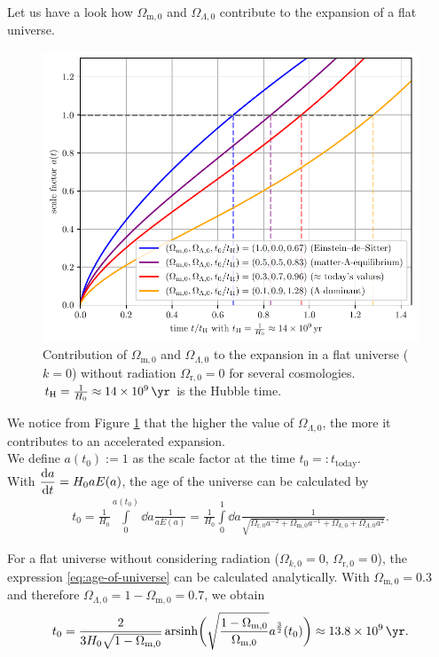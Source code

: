 \noindent Let us have a look how $\Omega_{\text{m},0}$ and $\Omega_{\Lambda,0}$ contribute to the expansion of a flat universe. 

\begin{figure}[H]
    \centering
    \includegraphics[scale=1.0]{figures/plots/PDF/time-vs-scale-factor}
    \caption{Contribution of $\Omega_{\text{m},0}$ and $\Omega_{\Lambda,0}$ to the expansion in a flat universe ($k = 0$) without radiation $\Omega_{\text{r},0} = 0$ for several cosmologies. $t_{\text{H}} = \frac{1}{H_{0}} \approx \SI{14e+9}{\yr}$ is the Hubble time.}
    \label{fig:time-vs-scale-factor}
\end{figure}

\noindent We notice from Figure \ref{fig:time-vs-scale-factor} that the higher the value of $\Omega_{\Lambda,0}$, the more it contributes to an accelerated expansion. \\

\noindent We define $a(t_{0}) := 1$ as the scale factor at the time $t_{0} =: t_{\text{today}}$. \\
With $\displaystyle \dv{a}{t} = H_{0} a E(a)$, the age of the universe can be calculated by 
\begin{align}
    t_{0} = \frac{1}{H_{0}} \int\limits_{0}^{a(t_{0})} \dd{a} \frac{1}{a E(a)} = \frac{1}{H_{0}} \int\limits_{0}^{1} \dd{a} \frac{1}{\sqrt{\Omega_{\text{r},0} a^{-2} + \Omega_{\text{m},0} a^{-1} + \Omega_{k,0} + \Omega_{\Lambda,0} a^{2}}}. \label{eq:age-of-universe}
\end{align}

\noindent For a flat universe without considering radiation ($\Omega_{k,0} =0$, $\Omega_{\text{r},0} = 0$), the expression \eqref{eq:age-of-universe} can be calculated analytically. With $\Omega_{\text{m},0} = 0.3$ and therefore $\Omega_{\Lambda,0} = 1 - \Omega_{\text{m},0} = 0.7$, we obtain 
\begin{align}
    t_{0} = \frac{2}{3 H_{0} \sqrt{1 - \Omega_{\text{m},0}}} \arsinh \biggl( \sqrt{\frac{1 - \Omega_{\text{m},0}}{\Omega_{\text{m},0}}} a^{\frac{3}{2}}(t_{0}) \biggr) \approx \SI{13.8e+9}{\yr}. 
\end{align}


